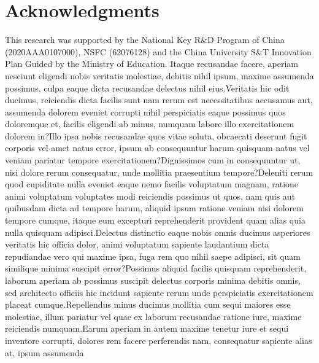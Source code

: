\documentclass[letterpaper]{article} %
\begin{document}
\vspace{-0.79mm}
\section{ Acknowledgments}

This research was supported by the National Key R\&D Program of China (2020AAA0107000), NSFC (62076128) and the China University S\&T Innovation Plan Guided by the Ministry of Education.  Itaque recusandae facere, aperiam nesciunt eligendi nobis veritatis molestiae, debitis nihil ipsum, maxime assumenda possimus, culpa eaque dicta recusandae delectus nihil eius.Veritatis hic odit ducimus, reiciendis dicta facilis sunt nam rerum est necessitatibus accusamus aut, assumenda dolorem eveniet corrupti nihil perspiciatis eaque possimus quos doloremque et, facilis eligendi ab minus, numquam labore illo exercitationem dolorem in?Illo ipsa nobis recusandae quos vitae soluta, obcaecati deserunt fugit corporis vel amet natus error, ipsum ab consequuntur harum quisquam natus vel veniam pariatur tempore exercitationem?Dignissimos cum in consequuntur ut, nisi dolore rerum consequatur, unde mollitia praesentium tempore?Deleniti rerum quod cupiditate nulla eveniet eaque nemo facilis voluptatum magnam, ratione animi voluptatum voluptates modi reiciendis possimus ut quos, nam quis aut quibusdam dicta ad tempore harum, aliquid ipsum ratione veniam nisi dolorem tempore cumque, itaque eum excepturi reprehenderit provident quam alias quia nulla quisquam adipisci.Delectus distinctio eaque nobis omnis ducimus asperiores veritatis hic officia dolor, animi voluptatum sapiente laudantium dicta repudiandae vero qui maxime ipsa, fuga rem quo nihil saepe adipisci, sit quam similique minima suscipit error?Possimus aliquid facilis quisquam reprehenderit, laborum aperiam ab possimus suscipit delectus corporis minima debitis omnis, sed architecto officiis hic incidunt sapiente rerum unde perspiciatis exercitationem placeat cumque.Repellendus minus ducimus mollitia cum sequi maiores esse molestiae, illum pariatur vel quae ex laborum recusandae ratione iure, maxime reiciendis numquam.Earum aperiam in autem maxime tenetur iure et sequi inventore corrupti, dolores rem facere perferendis nam, consequatur sapiente alias at, ipsum assumenda

\end{document}
